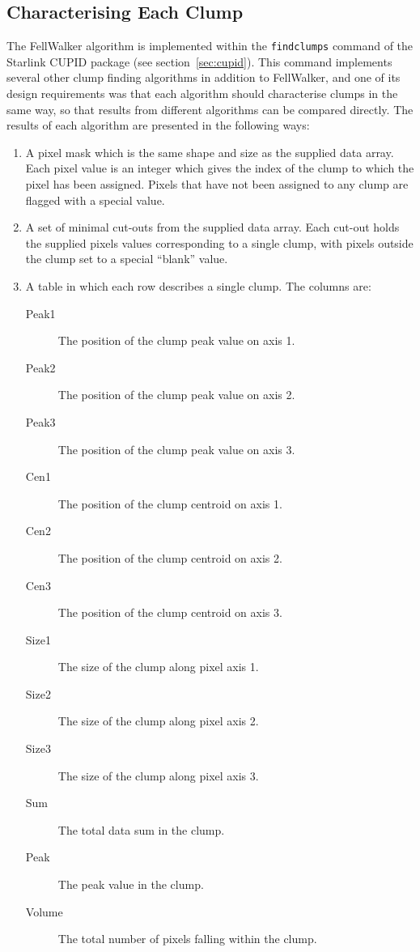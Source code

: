 \documentclass[final,authoryear,5p,times,twocolumn]{elsarticle}
\begin{document}
\subsection{Characterising Each Clump}
The FellWalker algorithm is implemented within the {\tt findclumps}
command of the Starlink CUPID package (see section~\ref{sec:cupid}). This
command implements several other clump finding algorithms in addition to
FellWalker, and one of its design requirements was that each algorithm should characterise clumps in
the same way, so that results from different algorithms can be compared
directly. The results of each algorithm are presented in the following ways:

\begin{enumerate}

\item A pixel mask which is the same shape and size as the supplied data
array. Each pixel value is an integer which gives the index of the clump
to which the pixel has been assigned. Pixels that have not been assigned
to any clump are flagged with a special value.

\item A set of minimal cut-outs from the supplied data array. Each cut-out
holds the supplied pixels values corresponding to a single clump, with pixels
outside the clump set to a special ``blank'' value.

\item A table in which each row describes a single clump. The columns are:

\begin{description}
\item[Peak1] The position of the clump peak value on axis 1.
\item[Peak2] The position of the clump peak value on axis 2.
\item[Peak3] The position of the clump peak value on axis 3.
\item[Cen1] The position of the clump centroid on axis 1.
\item[Cen2] The position of the clump centroid on axis 2.
\item[Cen3] The position of the clump centroid on axis 3.
\item[Size1] The size of the clump along pixel axis 1.
\item[Size2] The size of the clump along pixel axis 2.
\item[Size3] The size of the clump along pixel axis 3.
\item[Sum] The total data sum in the clump.
\item[Peak] The peak value in the clump.
\item[Volume] The total number of pixels falling within the clump.
\end{description}


\end{enumerate}
\end{document}

